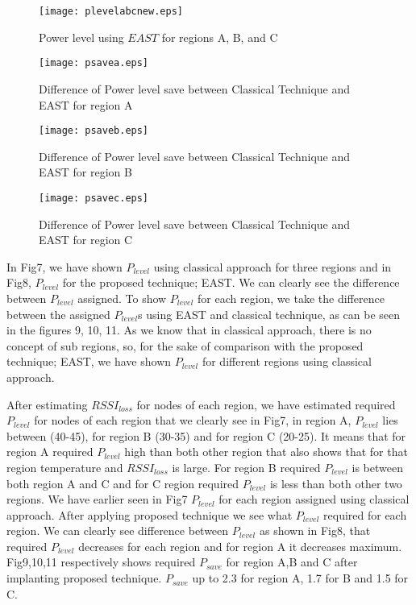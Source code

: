 \documentclass[12pt, conference, compsocconf, onecolumn, draftcls]{IEEEtran}
\begin{document}
\begin{figure}[h]
\begin{center}
\texttt{[image: plevelabcnew.eps]}
\caption{ Power level using $EAST$ for regions A, B, and C}
\end{center}
\end{figure}
\begin{figure}[h]
\begin{center}
\texttt{[image: psavea.eps]}
\caption{Difference of Power level save between Classical Technique and EAST for region A}
\end{center}
\end{figure}
\begin{figure}[h]
\begin{center}
\texttt{[image: psaveb.eps]}
\caption{Difference of Power level save between Classical Technique and EAST for region B}
\end{center}
\end{figure}
\begin{figure}[h]
\begin{center}
\texttt{[image: psavec.eps]}
\caption{Difference of Power level save between Classical Technique and EAST for region C}
\end{center}
\end{figure}

In Fig7, we have shown $P_{level}$ using classical approach for three regions and in Fig8, $P_{level}$ for the proposed technique; EAST. We can clearly see the difference between $P_{level}$ assigned. To show $P_{level}$ for each region, we take the difference between the assigned $P_{level}$s using EAST and classical technique, as can be seen in the figures 9, 10, 11. As we know that in classical approach, there is no concept of sub regions, so, for the sake of comparison with the proposed technique; EAST, we have shown $P_{level }$ for different regions using classical approach.

After estimating $RSSI_{loss}$ for nodes of each region, we have estimated required $P_{level}$ for nodes of each region that we clearly see in Fig7, in region A, $P_{level}$ lies between (40-45), for region B (30-35) and for region C (20-25). It means that for region A required $P_{level}$ high than both other region that also shows that for that region temperature and $RSSI_{loss}$ is large. For region B required $P_{level}$ is between both region A and C and for C region required $P_{level}$ is less than both other two regions. We have earlier seen in Fig7 $P_{level}$ for each region assigned using classical approach. After applying proposed technique we see what $P_{level}$ required for each region. We can clearly see difference  between $P_{level}$ as shown in Fig8, that required $P_{level}$ decreases for each region and for region A it decreases maximum. Fig9,10,11 respectively  shows required $P_{save}$ for region A,B and C after implanting proposed technique. $P_{save}$ up to 2.3 for region A, 1.7 for B and 1.5 for C.
\end{document}
